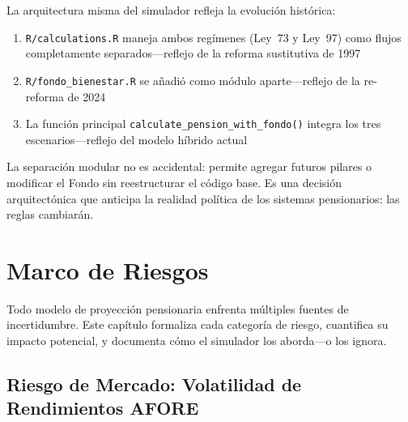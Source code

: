 \documentclass[11pt,a4paper]{report}
\begin{document}
\begin{tcolorbox}[colback=orange!5!white, colframe=orange!75!black, title=\textbf{Aplicaci\'on en C\'odigo: Impl\'icito en la Arquitectura del Simulador}]
La arquitectura misma del simulador refleja la evoluci\'on hist\'orica:

\begin{enumerate}
  \item \texttt{R/calculations.R} maneja ambos reg\'imenes (Ley~73 y Ley~97) como flujos completamente separados---reflejo de la reforma sustitutiva de 1997
  \item \texttt{R/fondo\_bienestar.R} se a\~nadi\'o como m\'odulo aparte---reflejo de la re-reforma de 2024
  \item La funci\'on principal \texttt{calculate\_pension\_with\_fondo()} integra los tres escenarios---reflejo del modelo h\'ibrido actual
\end{enumerate}

La separaci\'on modular no es accidental: permite agregar futuros pilares o modificar el Fondo sin reestructurar el c\'odigo base. Es una decisi\'on arquitect\'onica que anticipa la realidad pol\'itica de los sistemas pensionarios: las reglas cambiar\'an.
\end{tcolorbox}



\chapter{Marco de Riesgos}

Todo modelo de proyecci\'on pensionaria enfrenta m\'ultiples fuentes de incertidumbre. Este cap\'itulo formaliza cada categor\'ia de riesgo, cuantifica su impacto potencial, y documenta c\'omo el simulador los aborda---o los ignora.

\section{Riesgo de Mercado: Volatilidad de Rendimientos AFORE}
\end{document}
